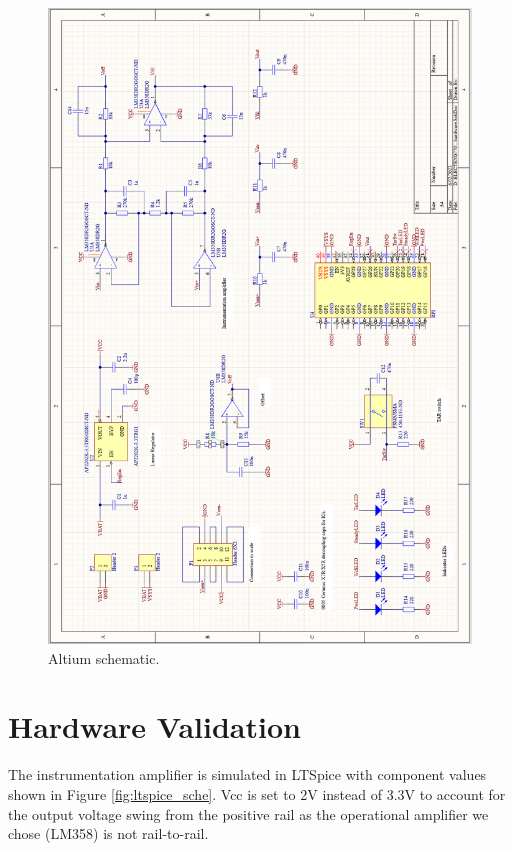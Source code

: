 \begin{figure}[h]
    \centering
    \includegraphics[width=\textwidth]{final-report/assets/altium_schematic.png}
    \caption{Altium schematic.}
    \label{fig:altium_sche}
\end{figure}

\section{Hardware Validation}
The instrumentation amplifier is simulated in LTSpice with component values shown in Figure \ref{fig:ltspice_sche}. Vcc is set to 2V instead of 3.3V to account for the output voltage swing from the positive rail as the operational amplifier we chose (LM358) is not rail-to-rail.

